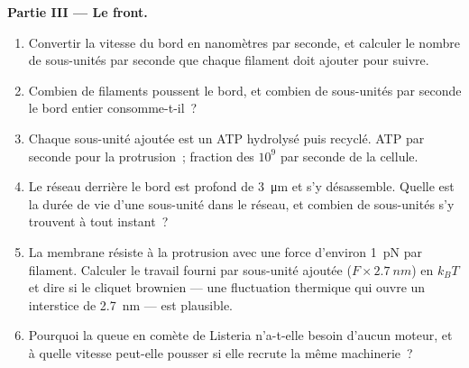 \begin{problem}
\medskip
\noindent\textbf{Partie III --- Le front.}
\begin{enumerate}[resume]
  \item Convertir la vitesse du bord en nanomètres par seconde, et
        calculer le nombre de sous-unités par seconde que chaque
        filament doit ajouter pour suivre.
  \item Combien de filaments poussent le bord, et combien de
        sous-unités par seconde le bord entier consomme-t-il~?
  \item Chaque sous-unité ajoutée est un ATP hydrolysé puis recyclé.
        ATP par seconde pour la protrusion~; fraction des $10^{9}$ par
        seconde de la cellule.
  \item Le réseau derrière le bord est profond de \qty{3}{\micro m} et
        s'y désassemble. Quelle est la durée de vie d'une sous-unité
        dans le réseau, et combien de sous-unités s'y trouvent à tout
        instant~?
  \item La membrane résiste à la protrusion avec une force d'environ
        \qty{1}{pN} par filament. Calculer le travail fourni par
        sous-unité ajoutée ($F\times \qty{2.7}{nm}$) en $k_{B}T$ et dire
        si le cliquet brownien --- une fluctuation thermique qui ouvre
        un interstice de \qty{2.7}{nm} --- est plausible.
  \item Pourquoi la queue en comète de Listeria n'a-t-elle besoin
        d'aucun moteur, et à quelle vitesse peut-elle pousser si elle
        recrute la même machinerie~?
\end{enumerate}


\end{problem}
